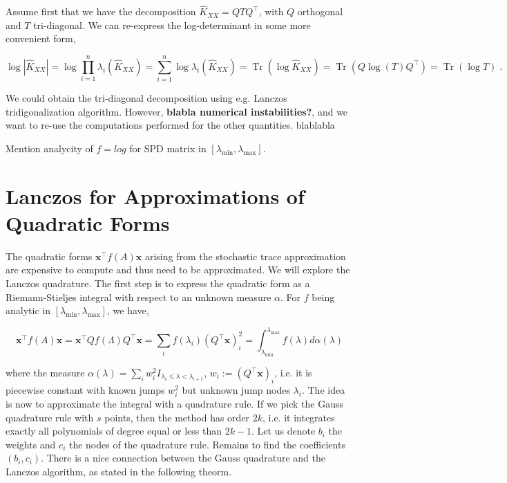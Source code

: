 \documentclass{article}
\newcommand{\vect}[1]{\boldsymbol{\mathbf{#1}}}
\DeclareMathOperator{\trace}{Tr}
\begin{document}
Assume first that we have the decomposition $\widehat K_{XX} = Q T Q^\top$, with $Q$ orthogonal and $T$ tri-diagonal. We can re-express the log-determinant in some more convenient form,

\begin{equation*}
    \log \left | \widehat K_{XX} \right | = \log \prod_{i=1}^n \lambda_i(\widehat K_{XX}) = \sum_{i=1}^n \log \lambda_i(\widehat K_{XX}) = \trace( \log \widehat K_{XX} ) = \trace(Q \log(T) Q^\top ) = \trace (\log T) \; .
\end{equation*}

We could obtain the tri-diagonal decomposition using e.g. Lanczos tridigonalization algorithm. However, \textbf{blabla numerical instabilities?}, and we want to re-use the computations performed for the other quantities. blablabla

Mention analycity of $f=log$ for SPD matrix in $[\lambda_{\min}, \lambda_{\max}]$.


\section{Lanczos for Approximations of Quadratic Forms}


The quadratic forms $\vect x^\top f(A) \vect x$ arising from the stochastic trace approximation are expensive to compute and thus need to be approximated. We will explore the Lanczos quadrature. The first step is to express the quadratic form as a Riemann-Stieljes integral with respect to an unknown measure $\alpha$. For $f$ being analytic in $[\lambda_{\min}, \lambda_{\max}]$, we have,

\begin{equation*}
    \vect x^\top f(A) \vect x = \vect x^\top Q f(\Lambda) Q^\top \vect x = \sum_i f(\lambda_i) (Q^\top \vect x)_i^2 = \int_{\lambda_{\min}}^{\lambda_{\max}} f(\lambda) d \alpha(\lambda)
\end{equation*}

where the measure $\alpha(\lambda) = \sum_i w_i^2 I_{\lambda_i \le \lambda < \lambda_{i+1}}$, $w_i := (Q^\top \vect x)_i$, i.e. it is piecewise constant with known jumps $w_i^2$ but unknown jump nodes $\lambda_i$. The idea is now to approximate the integral with a quadrature rule. If we pick the Gauss quadrature rule with $s$ points, then the method has order $2k$, i.e. it integrates exactly all polynomials of degree equal or less than $2k-1$. Let us denote $b_i$ the weights and $c_i$ the nodes of the quadrature rule. Remains to find the coefficients $(b_i, c_i)$. There is a nice connection between the Gauss quadrature and the Lanczos algorithm, as stated in the following theorm.
\end{document}
